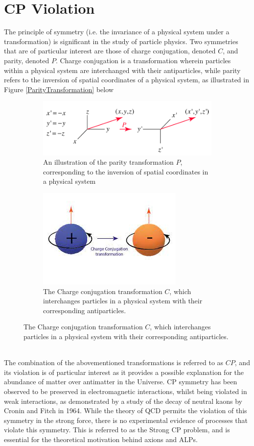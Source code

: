 \section{CP Violation}
The principle of symmetry (i.e. the invariance of a physical system under a transformation) is significant in the study of particle physics. Two symmetries that are of particular interest are those of charge conjugation, denoted $C$, and parity, denoted $P$. Charge conjugation is a transformation wherein particles within a physical system are interchanged with
their antiparticles, while parity refers to the inversion of spatial coordinates of a physical system, as illustrated in Figure \ref{ParityTransformation} below
\begin{figure}[h]
    \centering
    \begin{subfigure}{0.5\textwidth}
        \includegraphics[]{ParityTransformation.png}
        \caption{An illustration of the parity transformation $P$, corresponding
        to the inversion of spatial coordinates in a physical system}
        \label{fig:first}
    \end{subfigure}
    \hfill
    \begin{subfigure}{0.5\textwidth}
        \includegraphics[]{ChargeConjugation.jpg}
        \caption{The Charge conjugation transformation $C$, which interchanges particles in a physical system with their corresponding antiparticles.}
        \label{fig:second}
    \end{subfigure}
    \hfill
\end{figure}\\
The combination of the abovementioned transformations is referred to as $CP$, and its violation is of particular interest as it provides a possible explanation for the abundance of matter over antimatter in the Universe. CP symmetry has been observed to be preserved in electromagnetic interactions, whilst being violated in weak interactions, as demonstrated by 
a study of the decay of neutral kaons by Cronin and Fitch in 1964. While the theory of QCD permits the violation of this symmetry in the strong force, there is no experimental evidence of processes that violate this symmetry. This is referred to as the Strong CP problem, and is essential for the theoretical motivation behind axions and ALPs.
